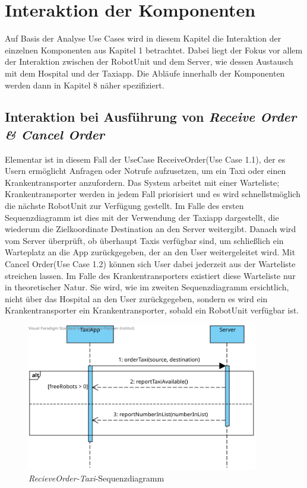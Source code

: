 \section{Interaktion der Komponenten}
Auf Basis der Analyse Use Cases wird in diesem Kapitel die Interaktion der einzelnen Komponenten aus Kapitel 1 betrachtet. 
Dabei liegt der Fokus vor allem der Interaktion zwischen der RobotUnit und dem Server, wie dessen Austausch mit dem Hospital und der Taxiapp. 
Die Abläufe innerhalb der Komponenten werden dann in Kapitel 8 näher spezifiziert. \\


\subsection*{Interaktion bei Ausführung von \emph{Receive Order \& Cancel Order}}

Elementar ist in diesem Fall der UseCase ReceiveOrder(Use Case 1.1), der es Usern ermöglicht Anfragen oder Notrufe aufzusetzen, um ein Taxi oder einen Krankentransporter anzufordern. 
Das System arbeitet mit einer Warteliste; Krankentransporter werden in jedem Fall priorisiert und es wird schnellstmöglich die nächste RobotUnit zur Verfügung gestellt. 
Im Falle des ersten Sequenzdiagramm ist dies mit der Verwendung der Taxiapp dargestellt, die wiederum die Zielkoordinate Destination an den Server weitergibt. 
Danach wird vom Server überprüft, ob überhaupt Taxis verfügbar sind, um schließlich ein Warteplatz an die App zurückgegeben, der an den User weitergeleitet wird. 
Mit Cancel Order(Use Case 1.2) können sich User dabei jederzeit aus der Warteliste streichen lassen. 
Im Falle des Krankentransporters existiert diese Warteliste nur in theoretischer Natur. 
Sie wird, wie im zweiten Sequenzdiagramm ersichtlich, nicht über das Hospital an den User zurückgegeben, sondern es wird ein Krankentransporter ein Krankentransporter, sobald ein RobotUnit verfügbar ist. \\

\begin{figure}[H]
	\centering
	\includegraphics[width=0.9\textwidth]{img/2-Entwurf-RecieveOrder-Taxi}
	\caption{\emph{RecieveOrder-Taxi}-Sequenzdiagramm}
	\label{SequenzDiagrammInteraktion}
\end{figure}


